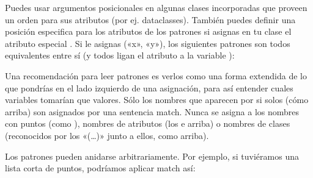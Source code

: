 \documentclass[a5paper,10pt,spanish]{sphinxmanual}
\begin{document}
\sphinxAtStartPar
Puedes usar argumentos posicionales en algunas clases incorporadas que proveen un orden para sus atributos (por ej. dataclasses). También puedes definir una posición especifica para los atributos de los patrones si asignas en tu clase el atributo especial . Si le asignas («x», «y»), los siguientes patrones son todos equivalentes entre sí (y todos ligan el atributo  a la variable ):

\begin{sphinxVerbatim}[commandchars=\\\{\}]
 
 
 
 
\end{sphinxVerbatim}

\sphinxAtStartPar
Una recomendación para leer patrones es verlos como una forma extendida de lo que pondrías en el lado izquierdo de una asignación, para así entender cuales variables tomarían que valores. Sólo los nombres que aparecen por si solos (cómo  arriba) son asignados por una sentencia match. Nunca se asigna a los nombres con puntos (como ), nombres de atributos (los  e  arriba) o nombres de clases (reconocidos por los «(…)» junto a ellos, como  arriba).

\sphinxAtStartPar
Los patrones pueden anidarse arbitrariamente. Por ejemplo, si tuviéramos una lista corta de puntos, podríamos aplicar match así:
\end{document}
